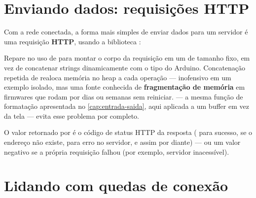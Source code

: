 \section{Enviando dados: requisições HTTP}

Com a rede conectada, a forma mais simples de enviar dados para um servidor é uma requisição \textbf{HTTP}, usando a biblioteca :


\begin{dica}
Repare no uso de  para montar o corpo da requisição em um  de tamanho fixo, em vez de concatenar strings dinamicamente com o tipo  do Arduino. Concatenação repetida de  realoca memória no heap a cada operação — inofensivo em um exemplo isolado, mas uma fonte conhecida de \textbf{fragmentação de memória} em firmwares que rodam por dias ou semanas sem reiniciar.  — a mesma função de formatação apresentada no \cref{cap:entrada-saida}, aqui aplicada a um buffer em vez da tela — evita esse problema por completo.
\end{dica}

O valor retornado por  é o código de status HTTP da resposta ( para sucesso,  se o endereço não existe,  para erro no servidor, e assim por diante) — ou um valor negativo se a própria requisição falhou (por exemplo, servidor inacessível).

\section{Lidando com quedas de conexão}

